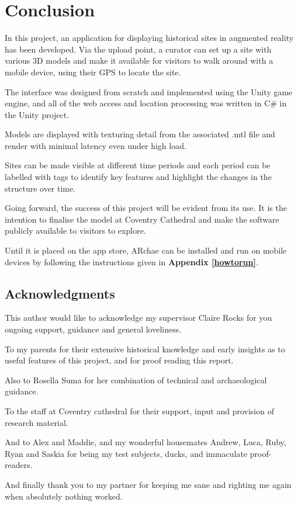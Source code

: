 \documentclass[12pt, a4paper]{article}
\begin{document}
\newpage
\section{Conclusion}
In this project, an application for displaying historical sites in augmented reality has been developed. Via the upload point, a curator can set up a site with various 3D models and make it available for visitors to walk around with a mobile device, using their GPS to locate the site. 

The interface was designed from scratch and implemented using the Unity game engine, and all of the web access and location processing was written in C\# in the Unity project. 

Models are displayed with texturing detail from the associated .mtl file and render with minimal latency even under high load. 

Sites can be made visible at different time periods and each period can be labelled with tags to identify key features and highlight the changes in the structure over time.

Going forward, the success of this project will be evident from its use. It is the intention to finalise the model at Coventry Cathedral and make the software publicly available to visitors to explore.

Until it is placed on the app store, ARchae can be installed and run on mobile devices by following the instructions given in \textbf{Appendix \ref{howtorun}}.

\newpage
\subsection*{\centering Acknowledgments}
This author would like to acknowledge my supervisor Claire Rocks for you ongoing support, guidance and general loveliness.

To my parents for their extensive historical knowledge and early insights as to useful features of this project, and for proof reading this report.

Also to Rosella Suma for her combination of technical and archaeological guidance.

To the staff at Coventry cathedral for their support, input and provision of research material.

And to Alex and Maddie, and my wonderful housemates Andrew, Luca, Ruby, Ryan and Saskia for being my test subjects, ducks, and immaculate proof-readers.

And finally thank you to my partner for keeping me sane and righting me again when absolutely nothing worked. 
\end{document}
